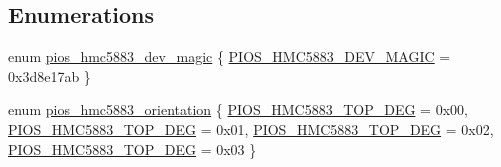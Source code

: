 \subsection*{Enumerations}
\begin{DoxyCompactItemize}
\item 
enum \hyperlink{group___p_i_o_s___h_m_c5883_ga694f4a1224c19ea7205e8865132bc4c8}{pios\-\_\-hmc5883\-\_\-dev\-\_\-magic} \{ \hyperlink{group___p_i_o_s___h_m_c5883_gga694f4a1224c19ea7205e8865132bc4c8a8a6521f0bc2fd12e7b8b34562bfa845c}{P\-I\-O\-S\-\_\-\-H\-M\-C5883\-\_\-\-D\-E\-V\-\_\-\-M\-A\-G\-I\-C} = 0x3d8e17ab
 \}
\item 
enum \hyperlink{group___p_i_o_s___h_m_c5883_ga9b5f48f8223effbfd7dbb15297957119}{pios\-\_\-hmc5883\-\_\-orientation} \{ \hyperlink{group___p_i_o_s___h_m_c5883_gga9b5f48f8223effbfd7dbb15297957119a6453f9d33a17899b4d4f764ee3db4edb}{P\-I\-O\-S\-\_\-\-H\-M\-C5883\-\_\-\-T\-O\-P\-\_\-D\-E\-G} = 0x00, 
\hyperlink{group___p_i_o_s___h_m_c5883_gga9b5f48f8223effbfd7dbb15297957119ac6e8b95b0acf44c225caf2898d1cb353}{P\-I\-O\-S\-\_\-\-H\-M\-C5883\-\_\-\-T\-O\-P\-\_\-D\-E\-G} = 0x01, 
\hyperlink{group___p_i_o_s___h_m_c5883_gga9b5f48f8223effbfd7dbb15297957119a0ff7330505c4d6f75c01c41dfdaf4400}{P\-I\-O\-S\-\_\-\-H\-M\-C5883\-\_\-\-T\-O\-P\-\_\-D\-E\-G} = 0x02, 
\hyperlink{group___p_i_o_s___h_m_c5883_gga9b5f48f8223effbfd7dbb15297957119af9a84c032f0ee432f8969eacd4fff3bf}{P\-I\-O\-S\-\_\-\-H\-M\-C5883\-\_\-\-T\-O\-P\-\_\-D\-E\-G} = 0x03
 \}
\end{DoxyCompactItemize}

